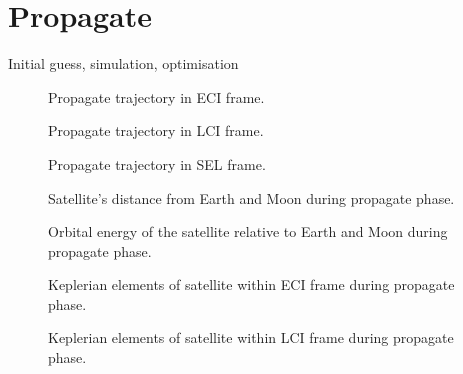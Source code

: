 
\clearpage 

\section{Propagate}
Initial guess, simulation, optimisation

\begin{figure}
\centering
\def\svgwidth{\figurewidth}

\caption{Propagate trajectory in ECI frame.}
\label{fig:Propagate-3D}
\end{figure}

\begin{figure}
\centering
\def\svgwidth{\figurewidth}

\caption{Propagate trajectory in LCI frame.}
\label{fig:Propagate-3D-lci}
\end{figure}

\begin{figure}
\centering
\def\svgwidth{\figurewidth}

\caption{Propagate trajectory in SEL frame.}
\label{fig:Propagate-3D-sel}
\end{figure}

\begin{figure}
\centering
\def\svgwidth{\figurewidth}

\caption{Satellite's distance from Earth and Moon during propagate phase.}
\label{fig:Propagate-dist}
\end{figure}

\begin{figure}
\centering
\def\svgwidth{\figurewidth}

\caption{Orbital energy of the satellite relative to Earth and Moon during propagate phase.}
\label{fig:Propagate-orbeng}
\end{figure}

\begin{figure}
\centering
\def\svgwidth{\figurewidth}

\caption{Keplerian elements of satellite within ECI frame during propagate phase.}
\label{fig:Propagate-kep}
\end{figure}

\begin{figure}
\centering
\def\svgwidth{\figurewidth}

\caption{Keplerian elements of satellite within LCI frame during propagate phase.}
\label{fig:Propagate-kep-lci}
\end{figure}

